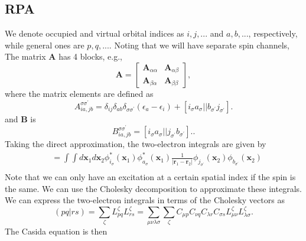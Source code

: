 \documentclass[12pt]{article}
\begin{document}
\subsection{RPA}
 We denote occupied and virtual orbital indices as $i,j,...$ and $a,b,...$, respectively, while general ones are $p,q,...$.
Noting that we will have separate spin channels, The matrix $\textbf{A}$ has 4 blocks, e.g.,
\begin{equation}
    \textbf{A} = \begin{bmatrix}
    \textbf{A}_{\alpha \alpha  } & \textbf{A}_{\alpha \beta } \\
    \textbf{A}_{\beta \alpha } & \textbf{A}_{\beta \beta}
    \end{bmatrix},
\end{equation}
where the matrix elements are defined as
\begin{equation}
    A_{ia,jb}^{\sigma \sigma ^{\prime}} = \delta _{ij}\delta _{ab}\delta _{\sigma \sigma ^{\prime}}(\epsilon _{a}- \epsilon _{i}) + [i_{\sigma}a_{\sigma}||b_{\sigma ^{\prime}}j_{\sigma ^{\prime}}].
\label{eq: A matrix RPA}
\end{equation}
and $\textbf{B}$ is
\begin{equation}
    B_{ia,jb}^{\sigma \sigma ^{\prime}} = [i_{\sigma}a_{\sigma}||j_{\sigma ^{\prime}}b_{\sigma ^{\prime}}].
\label{eq: B matrix RPA}.
\end{equation}
Taking the direct approximation, the two-electron integrals are given by
\begin{align}
    [i_{\sigma}a_{\sigma}|j_{\sigma ^{\prime}}b_{\sigma ^{\prime}}] &= \int \int d\mathbf{x}_1 d\mathbf{x}_2 \phi _{i_{\sigma}}^{*}(\mathbf{x}_1) \phi _{a_{\sigma}}^{*}(\mathbf{x}_1) \frac{1}{|\mathbf{r}_1 - \mathbf{r}_2|} \phi _{j_{\sigma ^{\prime}}}(\mathbf{x}_2) \phi _{b_{\sigma ^{\prime}}}(\mathbf{x}_2) \nonumber \\
\end{align}
Note that we can only have an excitation at a certain spatial index if the spin is the same.
We can use the Cholesky decomposition to approximate these integrals. We can express the two-electron integrals in terms of the Cholesky vectors as
\begin{equation}
    (pq|rs) = \sum _{\zeta} L_{pq}^{\zeta} L_{rs}^{\zeta} = \sum _{\mu \nu \lambda \sigma} \sum_{\zeta} C_{\mu p} C_{\nu q} C_{\lambda r} C_{\sigma s} L_{\mu \nu}^{\zeta} L_{\lambda \sigma}^{\zeta}.
\end{equation}
 The Casida equation is then
\end{document}
